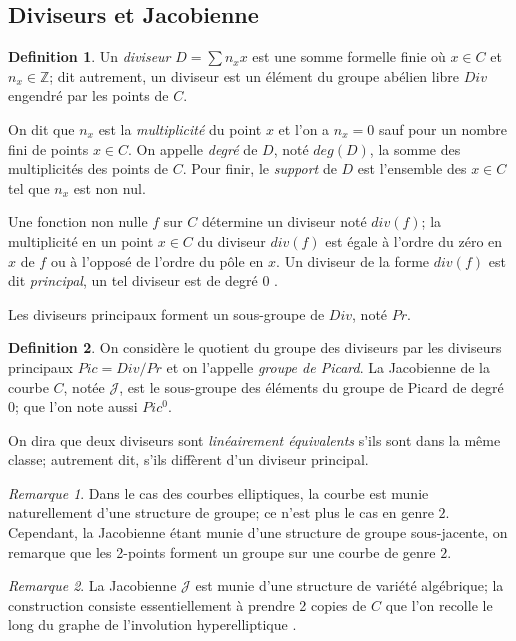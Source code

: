 \documentclass[a4paper,12pt]{article}
\theoremstyle{definition}
\newtheorem{definition}{Definition}[section]
\theoremstyle{remark}
\newtheorem{remarque}{Remarque}
\numberwithin{equation}{section}
\begin{document}
\subsection{Diviseurs et Jacobienne}

\begin{definition}
Un \emph{diviseur} $D = \sum n_x x$ est une somme formelle finie où $x \in C$ et $n_x \in \mathbb{Z}$; dit autrement, un diviseur est un élément du groupe abélien libre $Div$ engendré par les points de $C$.

On dit que $n_x$ est la \emph{multiplicité} du point $x$ et l'on a $n_x = 0$ sauf pour un nombre fini de points $x \in C$. On appelle \emph{degré} de $D$, noté $deg(D)$, la somme des multiplicités des points de $C$. Pour finir, le \emph{support} de $D$ est l'ensemble des $x \in C$ tel que $n_x$ est non nul.
\end{definition}

Une fonction non nulle $f$ sur $C$ détermine un diviseur noté $div(f)$; la multiplicité en un point $x \in C$ du diviseur $div(f)$ est égale à l'ordre du zéro en $x$ de $f$ ou à l'opposé de l'ordre du pôle en $x$. Un diviseur de la forme $div(f)$ est dit \emph{principal}, un tel diviseur est de degré 0 \citep{menezes}.

Les diviseurs principaux forment un sous-groupe de $Div$, noté $Pr$.
\begin{definition}
On considère le quotient du groupe des diviseurs par les diviseurs principaux $Pic = Div/Pr$ et on l'appelle \emph{groupe de Picard}.
La Jacobienne de la courbe $C$, notée $\mathcal{J}$, est le sous-groupe des éléments du groupe de Picard de degré 0; que l'on note aussi $Pic^0$.
\end{definition}

On dira que deux diviseurs sont \emph{linéairement équivalents} s'ils sont dans la même classe; autrement dit, s'ils diffèrent d'un diviseur principal.

\begin{remarque}
Dans le cas des courbes elliptiques, la courbe est munie naturellement d'une structure de groupe; ce n'est plus le cas en genre $2$. Cependant, la Jacobienne étant munie d'une structure de groupe sous-jacente, on remarque que les 2-points forment un groupe sur une courbe de genre $2$.
\end{remarque}

\begin{remarque}
La Jacobienne $\mathcal{J}$ est munie d'une structure de variété algébrique; la construction consiste essentiellement à prendre 2 copies de $C$ que l'on recolle le long du graphe de l'involution hyperelliptique \citep{cassels-Flynn}.
\end{remarque}
\end{document}

